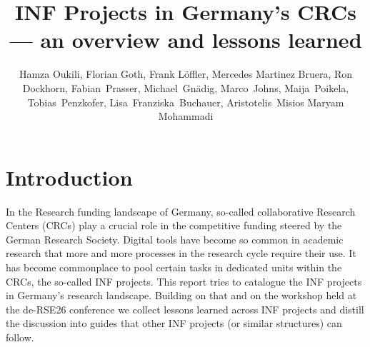 \documentclass{eceasst}
\title{INF Projects in Germany's CRCs --- an overview and lessons learned}
\author{
Hamza Oukili\authorOrcid{0000-0003-4695-8532}\authorRef{1},
Florian Goth\authorOrcid{0000-0003-2707-4790}\authorRef{2},
Frank Löffler\authorOrcid{0000-0001-6643-6323}\authorRef{3},
Mercedes Martinez Bruera\authorOrcid{0009-0004-2891-7045}\authorRef{4},
Ron Dockhorn\authorOrcid{0000-0002-5268-5430}\authorRef{{TUD}},
Fabian~Prasser\authorOrcid{0000-0003-3172-3095}\authorRef{5},
Michael~Gnädig\authorOrcid{}\authorRef{5},
Marco~Johns\authorOrcid{0000-0003-4706-6595}\authorRef{5},
Maija~Poikela\authorOrcid{0000-0003-2616-4401}\authorRef{5}, 
Tobias~Penzkofer\authorOrcid{0000-0001-9591-8575}\authorRef{6}, 
Lisa~Franziska~Buchauer\authorOrcid{0000-0002-4722-8390}\authorRef{6}, 
Aristotelis~Misios\authorOrcid{}\authorRef{6}
Maryam Mohammadi\authorOrcid{0009-0007-8747-029X}\authorRef{7}
} %
\institute{%
\autlabel{1} Institute for Modeling Hydraulic and Environmental Systems (IWS), University of Stuttgart,\\
\autlabel{2} Institut für theoretische Physik 1, University of Würzburg, 97074, Würzburg,\\
\autlabel{3} Heinz Nixdorf Chair for Distributed Information Systems, Jena, Germany,\\
\autlabel{4} Goethe-Universität Frankfurt am Main, Frankfurt am Main,\\
\autlabel{{TUD}} Center for Interdisciplinary Digital Sciences, Technische Universität Dresden, D-01069 Dresden, Germany,\\
\autlabel{5} Berlin Institute of Health at Charité - Universitätsmedizin Berlin, Berlin, Germany\\
\autlabel{6} Charité - Universitätsmedizin Berlin, Berlin, Germany\\
\autlabel{7} Linguistic Department, University of Bielefeld\\
}
\begin{document}
\maketitle

\section{Introduction}
In the Research funding landscape of Germany, so-called collaborative Research Centers (CRCs) play a crucial role in the competitive funding steered by the German Research Society.
Digital tools have become so common in academic research that more and more processes in the research cycle require their use.
It has become commonplace to pool certain tasks in dedicated units within the CRCs, the so-called INF projects.
This report tries to catalogue the INF projects in Germany's research landscape.
Building on that and on the workshop held at the de-RSE26 conference we collect lessons learned across INF projects and distill the discussion into guides that other INF projects (or similar structures) can follow.
\end{document}
